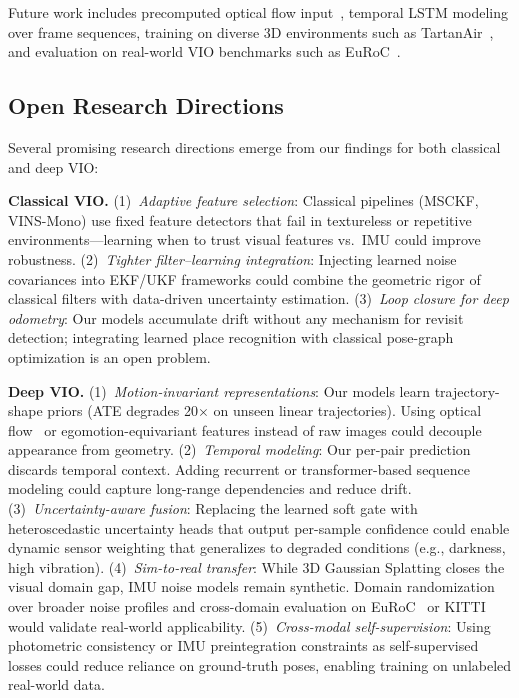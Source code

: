 \documentclass[conference]{IEEEtran}
\begin{document}
Future work includes precomputed optical flow input~\cite{wang2021, teed2020}, temporal LSTM modeling over frame sequences, training on diverse 3D environments such as TartanAir~\cite{wang2020tartanair}, and evaluation on real-world VIO benchmarks such as EuRoC~\cite{burri2016}.

\subsection{Open Research Directions}

Several promising research directions emerge from our findings for both classical and deep VIO:

\textbf{Classical VIO.} (1)~\textit{Adaptive feature selection}: Classical pipelines (MSCKF, VINS-Mono) use fixed feature detectors that fail in textureless or repetitive environments---learning when to trust visual features vs.\ IMU could improve robustness. (2)~\textit{Tighter filter--learning integration}: Injecting learned noise covariances into EKF/UKF frameworks could combine the geometric rigor of classical filters with data-driven uncertainty estimation. (3)~\textit{Loop closure for deep odometry}: Our models accumulate drift without any mechanism for revisit detection; integrating learned place recognition with classical pose-graph optimization is an open problem.

\textbf{Deep VIO.} (1)~\textit{Motion-invariant representations}: Our models learn trajectory-shape priors (ATE degrades 20$\times$ on unseen linear trajectories). Using optical flow~\cite{teed2020} or egomotion-equivariant features instead of raw images could decouple appearance from geometry. (2)~\textit{Temporal modeling}: Our per-pair prediction discards temporal context. Adding recurrent or transformer-based sequence modeling could capture long-range dependencies and reduce drift. (3)~\textit{Uncertainty-aware fusion}: Replacing the learned soft gate with heteroscedastic uncertainty heads that output per-sample confidence could enable dynamic sensor weighting that generalizes to degraded conditions (e.g., darkness, high vibration). (4)~\textit{Sim-to-real transfer}: While 3D Gaussian Splatting closes the visual domain gap, IMU noise models remain synthetic. Domain randomization over broader noise profiles and cross-domain evaluation on EuRoC~\cite{burri2016} or KITTI~\cite{geiger2012} would validate real-world applicability. (5)~\textit{Cross-modal self-supervision}: Using photometric consistency or IMU preintegration constraints as self-supervised losses could reduce reliance on ground-truth poses, enabling training on unlabeled real-world data.
\end{document}
